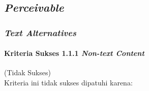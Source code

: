 \subsection{\textit{Perceivable}}
\label{subsec:kepatuhan_bluetape_perceivable}

\subsubsection{\textit{Text Alternatives}}
\label{subsubsec:kepatuhan_bluetape_text_alternatives}

\paragraph{Kriteria Sukses 1.1.1 \textit{Non-text Content}}
\label{par:kepatuhan_bluetape_kriteria_sukses_1.1.1}
(Tidak Sukses)\\

Kriteria ini tidak sukses dipatuhi karena: 


